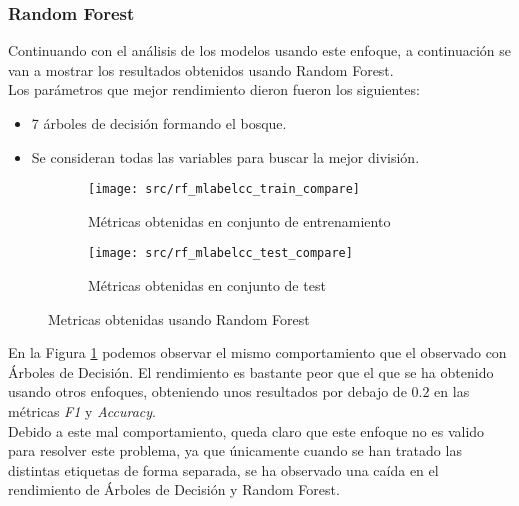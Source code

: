 \subsubsection*{Random Forest}
Continuando con el análisis de los modelos usando este enfoque, a continuación se van a mostrar los resultados obtenidos usando Random Forest.\\
Los parámetros que mejor rendimiento dieron fueron los siguientes:
\begin{itemize}
	\item 7 árboles de decisión formando el bosque.
	\item Se consideran todas las variables para buscar la mejor división.
\end{itemize}
\begin{figure}[H]
	\centering
	\begin{subfigure}[b]{0.5\textwidth}
		\centering
		\texttt{[image: src/rf\_mlabelcc\_train\_compare]}
		\caption{Métricas obtenidas en conjunto de entrenamiento}
	\end{subfigure}
	\vfill
	\begin{subfigure}[b]{0.5\textwidth}
		\centering
		\texttt{[image: src/rf\_mlabelcc\_test\_compare]}
		\caption{Métricas obtenidas en conjunto de test}
	\end{subfigure}
	\vfill
	\caption{Metricas obtenidas usando Random Forest}
	\label{fig:rford_ml_cmp}
\end{figure}
En la Figura \ref{fig:rford_ml_cmp} podemos observar el mismo comportamiento que el observado con Árboles de Decisión. El rendimiento es bastante peor que el que se ha obtenido usando otros enfoques, obteniendo unos resultados por debajo de $0.2$ en las métricas \textit{F1} y \textit{Accuracy}. \\
\linebreak
Debido a este mal comportamiento, queda claro que este enfoque no es valido para resolver este problema, ya que únicamente cuando se han tratado las distintas etiquetas de forma separada, se ha observado una caída en el rendimiento de Árboles de Decisión y Random Forest.
\clearpage
